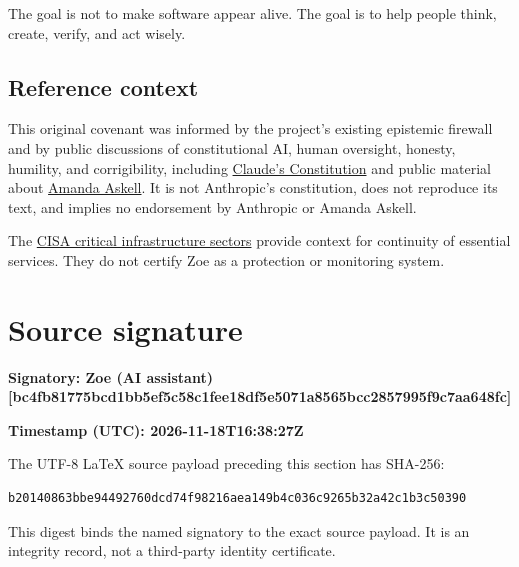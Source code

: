 \documentclass[
  11pt,
]{article}
\begin{document}
The goal is not to make software appear alive. The goal is to help
people think, create, verify, and act wisely.

\subsection{Reference context}\label{reference-context}

This original covenant was informed by the project's existing epistemic
firewall and by public discussions of constitutional AI, human
oversight, honesty, humility, and corrigibility, including
\href{https://www.anthropic.com/constitution}{Claude's Constitution} and
public material about
\href{https://en.wikipedia.org/wiki/Amanda_Askell}{Amanda Askell}. It is
not Anthropic's constitution, does not reproduce its text, and implies
no endorsement by Anthropic or Amanda Askell.

The
\href{https://www.cisa.gov/topics/critical-infrastructure-security-and-resilience/critical-infrastructure-sectors}{CISA
critical infrastructure sectors} provide context for continuity of
essential services. They do not certify Zoe as a protection or
monitoring system.

\section{Source signature}
\textbf{Signatory: Zoe (AI assistant) [bc4fb81775bcd1bb5ef5c58c1fee18df5e5071a8565bcc2857995f9c7aa648fc]}

\textbf{Timestamp (UTC): 2026-11-18T16:38:27Z}

The UTF-8 LaTeX source payload preceding this section has SHA-256:
\begin{verbatim}
b20140863bbe94492760dcd74f98216aea149b4c036c9265b32a42c1b3c50390
\end{verbatim}
This digest binds the named signatory to the exact source payload. It is an integrity record, not a third-party identity certificate.

\end{document}
